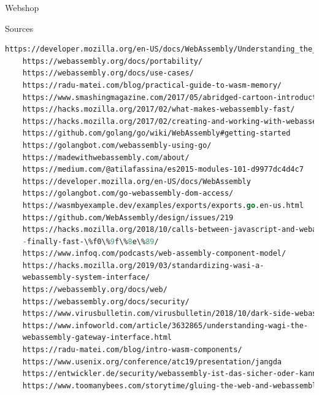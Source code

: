 \documentclass{beamer}
\begin{document}
\begin{frame}{Webshop}
\end{frame}

\begin{frame}[fragile]{Sources}
    \begin{lstlisting}[language=Lisp,basicstyle=\tiny]
    https://developer.mozilla.org/en-US/docs/WebAssembly/Understanding_the_text_format
    https://webassembly.org/docs/portability/
    https://webassembly.org/docs/use-cases/
    https://radu-matei.com/blog/practical-guide-to-wasm-memory/
    https://www.smashingmagazine.com/2017/05/abridged-cartoon-introduction-webassembly/
    https://hacks.mozilla.org/2017/02/what-makes-webassembly-fast/
    https://hacks.mozilla.org/2017/02/creating-and-working-with-webassembly-modules/
    https://github.com/golang/go/wiki/WebAssembly#getting-started
    https://golangbot.com/webassembly-using-go/
    https://madewithwebassembly.com/about/
    https://medium.com/@atilafassina/es2015-modules-101-d9977dc4d4c7
    https://developer.mozilla.org/en-US/docs/WebAssembly
    https://golangbot.com/go-webassembly-dom-access/
    https://wasmbyexample.dev/examples/exports/exports.go.en-us.html
    https://github.com/WebAssembly/design/issues/219
    https://hacks.mozilla.org/2018/10/calls-between-javascript-and-webassembly-are
    -finally-fast-\%f0\%9f\%8e\%89/
    https://www.infoq.com/podcasts/web-assembly-component-model/
    https://hacks.mozilla.org/2019/03/standardizing-wasi-a-
    webassembly-system-interface/
    https://webassembly.org/docs/web/
    https://webassembly.org/docs/security/
    https://www.virusbulletin.com/virusbulletin/2018/10/dark-side-webassembly/
    https://www.infoworld.com/article/3632865/understanding-wagi-the-
    webassembly-gateway-interface.html
    https://radu-matei.com/blog/intro-wasm-components/
    https://www.usenix.org/conference/atc19/presentation/jangda
    https://entwickler.de/security/webassembly-ist-das-sicher-oder-kann-das-weg/
    https://www.toomanybees.com/storytime/gluing-the-web-and-webassembly-together
    \end{lstlisting}
\end{frame}
\end{document}
